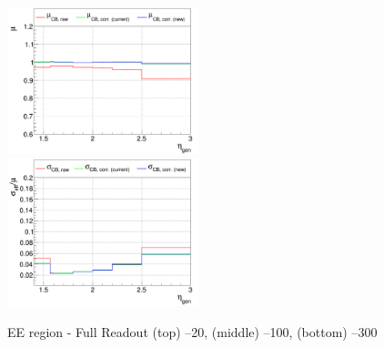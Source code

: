 \begin{figure}
\includegraphics[width=0.495\textwidth]{./plots_pdf/ECAL_plots/plotsPU/EE/FULL/pdf/GENETA/EEFULL_GENETA_0100_0300_MuOverBins.pdf}
\includegraphics[width=0.495\textwidth]{./plots_pdf/ECAL_plots/plotsPU/EE/FULL/pdf/GENETA/EEFULL_GENETA_0100_0300_EffSigmaOverBins.pdf}


\caption{EE region - Full Readout (top) --20\GeV , (middle) --100\GeV, (bottom) --300\GeV}
\label{fig:PU_EEFULL_eta}
\end{figure}






